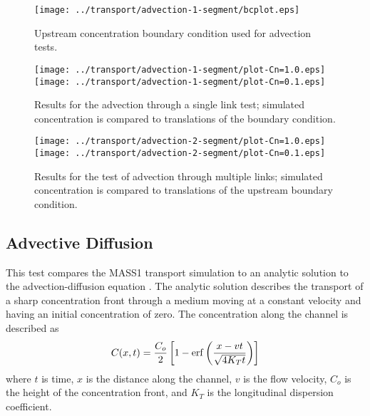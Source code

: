 \documentclass[12pt,dvips,letterpaper]{article}
\begin{document}
\begin{figure}[htbp]
  \begin{center}
    \texttt{[image: ../transport/advection-1-segment/bcplot.eps]}
    \caption{Upstream concentration boundary condition used for
      advection tests.} 
    \label{fig:test-advection-bc}
  \end{center}
\end{figure}

\begin{figure}[htbp]
  \begin{center}
    \texttt{[image: ../transport/advection-1-segment/plot-Cn=1.0.eps]}
    \texttt{[image: ../transport/advection-1-segment/plot-Cn=0.1.eps]}
    \caption{Results for the advection through a single link test;
      simulated concentration is compared to translations of the
      boundary condition.} 
    \label{fig:test-advection-1-results}
  \end{center}
\end{figure}

\begin{figure}[htbp]
  \begin{center}
    \texttt{[image: ../transport/advection-2-segment/plot-Cn=1.0.eps]}
    \texttt{[image: ../transport/advection-2-segment/plot-Cn=0.1.eps]}
    \caption{Results for the test of advection through multiple links;
      simulated concentration is compared to translations of the upstream
      boundary condition.}
    \label{fig:test-advection-2-results}
  \end{center}
\end{figure}



\subsection{Advective Diffusion}
\label{sec:test-advection-diffusion-1-link}

This test compares the MASS1 transport simulation to an analytic
solution to the advection-diffusion equation \citep[][\S~2.4]{Fis79}.
The analytic solution describes the transport of a sharp concentration
front through a medium moving at a constant velocity and having an
initial concentration of zero.  The concentration along the channel is
described as
\begin{equation}
  \label{eq:2}
  C(x,t) = { { C_{o} } \over 2 } \left[ { 1 - \mathrm{erf} \left( { { x - vt } 
          \over { \sqrt{4 K_{T} t} } } \right) } \right]
\end{equation}
where $t$ is time, $x$ is the distance along the channel, $v$ is the
flow velocity, $C_{o}$ is the height of the concentration front, and
$K_{T}$ is the longitudinal dispersion coefficient.  
\end{document}
